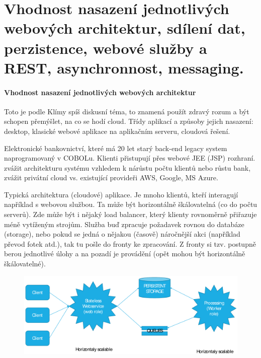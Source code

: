 \section[WA2 - Web. architektury, perzistence, WS, messaging]{Vhodnost nasazení jednotlivých webových architektur, sdílení dat, perzistence, webové služby a REST, asynchronnost, messaging.}

\paragraph{Vhodnost nasazení jednotlivých webových architektur}
Toto je podle Klímy spíš diskusní téma, to znamená použít zdravý rozum a být schopen přemýšlet, na co se hodí cloud. Třídy aplikací a způsoby jejich nasazení: desktop, klasické webové aplikace na aplikačním serveru, cloudová řešení.

\priklad Elektronické bankovnictví, které má 20 let starý back-end legacy system naprogramovaný v COBOLu. Klienti přistupují přes webové JEE (JSP) rozhraní. zvážit architekturu systému vzhledem k nárůstu počtu klientů nebo růstu bank, zvážit privátní cloud vs. existující provideři AWS, Google, MS Azure.

Typická architektura (cloudové) aplikace. Je mnoho klientů, kteří interagují například s webovou službou. Ta může být horizontálně škálovatelná (co do počtu serverů). Zde může být i nějaký load balancer, který klienty rovnoměrně přiřazuje méně vytíženým strojům. Služba buď zpracuje požadavek rovnou do databáze (storage), nebo pokud se jedná o nějakou (časově) náročnější akci (například převod fotek atd.), tak tu pošle do fronty ke zpracování. Z fronty si tzv.  postupně berou jednotlivé úlohy a na pozadí je provádění (opět mohou být horizontálně škálovatelné).

\begin{figure}[h!]
\centering
\includegraphics[width=140mm]{17/images/cloud-architecture}
\end{figure}

